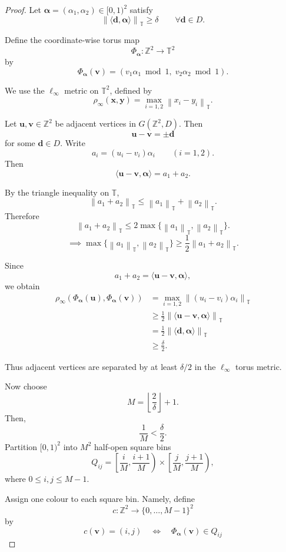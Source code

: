 \documentclass[10pt,a4paper]{amsart}
\newcommand{\T}{\mathbb{T}}
\newcommand{\Z}{\mathbb{Z}}
\newcommand{\floor}[1]{\left\lfloor#1\right\rfloor}
\newcommand{\norm}[1]{\left\|#1\right\|}
\begin{document}
\begin{proof}
Let $\boldsymbol\alpha=(\alpha_1,\alpha_2)\in [0,1)^2$ satisfy
\[
\norm{\langle \mathbf d,\boldsymbol\alpha\rangle}_{\T}\ge \delta
\qquad
\forall \mathbf d\in D.
\]

Define the coordinate-wise torus map
\[
\Phi_{\boldsymbol\alpha}:\Z^2\to \T^2
\]
by
\begin{equation}
\Phi_{\boldsymbol\alpha}(\mathbf v)
=
(v_1\alpha_1 \bmod 1,\; v_2\alpha_2 \bmod 1).
\end{equation}

We use the $\ell_\infty$ metric on $\T^2$, defined by
\[
\rho_\infty(\mathbf x,\mathbf y)
=
\max_{i=1,2}\norm{x_i-y_i}_{\T}.
\]

Let $\mathbf u,\mathbf v\in \Z^2$ be adjacent vertices in $G(\Z^2,D)$. Then
\[
\mathbf u-\mathbf v=\pm \mathbf d
\]
for some $\mathbf d\in D$. Write
\[
a_i=(u_i-v_i)\alpha_i
\qquad
(i=1,2).
\]
Then
\[
\langle \mathbf u-\mathbf v,\boldsymbol\alpha\rangle
=
a_1+a_2.
\]

By the triangle inequality on $\T$,
\[
\norm{a_1+a_2}_{\T}
\le
\norm{a_1}_{\T}+\norm{a_2}_{\T}.
\]
Therefore
\[
\norm{a_1+a_2}_{\T}
\le
2\max\{\norm{a_1}_{\T},\norm{a_2}_{\T}\}.
\]
\begin{equation}
\implies \max\{\norm{a_1}_{\T},\norm{a_2}_{\T}\}
\ge
\frac12\norm{a_1+a_2}_{\T}.
\end{equation}

Since
\[
a_1+a_2
=
\langle \mathbf u-\mathbf v,\boldsymbol\alpha\rangle,
\]
we obtain
\begin{align}
\rho_\infty\!\left(
\Phi_{\boldsymbol\alpha}(\mathbf u),
\Phi_{\boldsymbol\alpha}(\mathbf v)
\right)
&=
\max_{i=1,2}\norm{(u_i-v_i)\alpha_i}_{\T} \\
&\ge
\frac12
\norm{\langle \mathbf u-\mathbf v,\boldsymbol\alpha\rangle}_{\T} \\
&=
\frac12
\norm{\langle \mathbf d,\boldsymbol\alpha\rangle}_{\T} \\
&\ge
\frac{\delta}{2}.
\end{align}

Thus adjacent vertices are separated by at least $\delta/2$ in the $\ell_\infty$ torus metric.

Now choose
\[
M=\floor{\frac{2}{\delta}}+1.
\]
Then,
\[
\frac1M<\frac{\delta}{2}.
\]
Partition $[0,1)^2$ into $M^2$ half-open square bins
\[
Q_{ij}
=
\left[\frac{i}{M},\frac{i+1}{M}\right)
\times
\left[\frac{j}{M},\frac{j+1}{M}\right),
\]
where $0\le i,j\le M-1$.

Assign one colour to each square bin. Namely, define
\[
c:\Z^2\to \{0,\dots,M-1\}^2
\]
by
\[
c(\mathbf v)=(i,j)
\quad\Longleftrightarrow\quad
\Phi_{\boldsymbol\alpha}(\mathbf v)\in Q_{ij}
\]


\end{proof}
\end{document}
